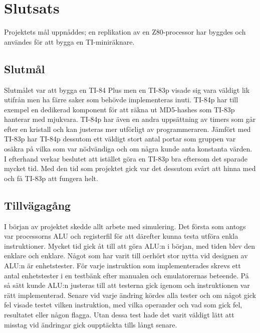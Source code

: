 \documentclass[main.tex]{subfiles}
\begin{document}
\newpage
\section{Slutsats}
Projektets mål uppnåddes; en replikation av en Z80-processor har byggdes och
användes för att bygga en TI-miniräknare. 

\subsection{Slutmål}
Slutmålet var att bygga en TI-84 Plus men en TI-83p visade sig vara väldigt lik
utifrån men ha färre saker som behövde implementeras inuti. TI-84p har till
exempel en dedikerad komponent för att räkna ut MD5-hashes som TI-83p hanterar
med mjukvara. TI-84p har även en andra uppsättning av timers som går efter en
kristall och kan justeras mer utförligt av programmeraren. Jämfört med TI-83p
har TI-84p dessutom ett väldigt stort antal portar som gruppen var osäkra på
vilka som var nödvändiga och om några kunde anta konstanta värden. I efterhand
verkar beslutet att istället göra en TI-83p bra eftersom det sparade mycket
tid. Med den tid som projektet gick var det dessutom svårt att hinna med och få
TI-83p att fungera helt.

\subsection{Tillvägagång}
I början av projektet skedde allt arbete med simulering. Det första som antogs
var processorns ALU och registerfil för att därefter kunna testa utföra enkla
instruktioner. Mycket tid gick åt till att göra ALU:n i början, med tiden blev
den enklare och enklare. Något som har varit till oerhört stor nytta vid
designen av ALU:n är enhetstester. För varje instruktion som implementerades
skrevs ett antal enhetstester i en testbänk efter manualen och emulatorernas
beteende. På så sätt kunde ALU:n justeras till att testerna gick igenom och
instruktionen var rätt implementerad. Senare vid varje ändring kördes alla
tester och om något gick fel visade testet vilken instruktion, med vilka
operander och vad som gick fel, resultatet eller någon flagga. Utan dessa test
hade det varit väldigt lätt att misstag vid ändringar gick oupptäckta tills
långt senare.
\end{document}
